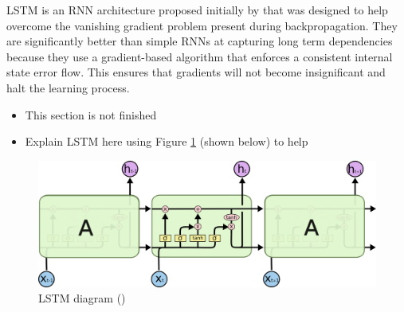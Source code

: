 \acrfull{LSTM} is an \acrshort{RNN} architecture proposed initially by \cite{hochreiter_long_1997} that was designed to help overcome the vanishing gradient problem present during backpropagation. They are significantly better than simple \acrshort{RNN}s at capturing long term dependencies because they use a gradient-based algorithm that enforces a consistent internal state error flow. This ensures that gradients will not become insignificant and halt the learning process.


\begin{itemize}
    \item This section is not finished
    \item Explain LSTM here using Figure \ref{fig:rnn_lstm} (shown below) to help
\end{itemize}


\begin{figure}[ht!]
\centering
\includegraphics[width=1\textwidth]{media/literature/machine_learning/ml_rnn_lstm.png}
\caption[Diagram of Long Short Term Memory]{\acrlong{LSTM} diagram (\cite{colah_lstm_2019})}
\label{fig:rnn_lstm}
\end{figure}




% 



